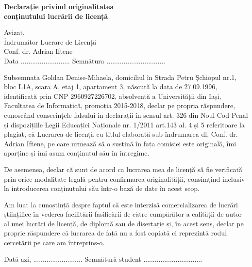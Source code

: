 \begin{center}
	\textbf{\large{Declarație privind originalitatea \\conținutului lucrării de licență}}
\end{center}
	
\begin{flushright}
	Avizat,\\
	Îndrumător Lucrare de Licență\\
	Conf. dr. Adrian Iftene\\
	Data \small{..........................} Semnătura \small{...............................}
\end{flushright}

Subsemnata Goldan Denise-Mihaela, domiciliul în Strada Petru Șchiopul nr.1, bloc L1A, scara A, etaj 1, apartament 3, născută la data de 27.09.1996, identificată prin CNP 2960927226702, absolventă a Universității  din Iași, Facultatea de Informatică, promoția 2015-2018, declar pe propria răspundere, cunoscând consecințele falsului în declarații în sensul art. 326 din Noul Cod Penal și dispozițiile Legii Educației Naționale nr. 1/2011 art.143 al. 4 și 5 referitoare la plagiat, că Lucrarea de licență cu titlul  elaborată sub îndrumarea dl. Conf. dr. Adrian Iftene, pe care urmează să o susțină în fața comisiei este originală, îmi aparține și îmi asum conținutul său în întregime.

De asemenea, declar că sunt de acord ca lucrarea mea de licență să fie verificată prin orice modalitate legală pentru confirmarea originalității, consimțind inclusiv la introducerea conținutului său într-o bază de date în acest scop.

Am luat la cunoștință despre faptul că este interzisă comercializarea de lucrări științifice în vederea facilitării fasificării de către cumpărător a calității de autor al unei lucrări de licență, de diplomă sau de disertație și, în acest sens, declar pe proprie răspundere că lucrarea de față nu a fost copiată ci reprezintă rodul cercetării pe care am întreprins-o.

\hfill \break

Dată azi, \small{..........................} \hfill Semnătură student \small{...............................} \\

\clearpage
